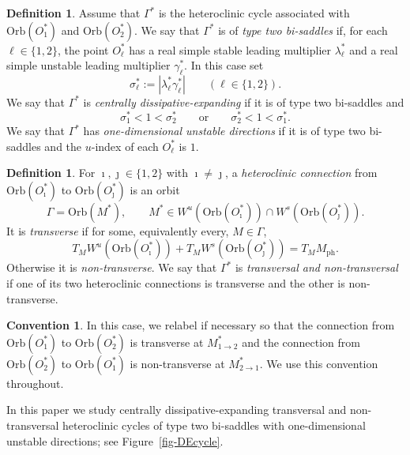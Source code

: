 \documentclass[11pt,a4paper]{article}
\theoremstyle{plain}
\theoremstyle{definition}
\newtheorem{definition}[theorem]{Definition}
\newtheorem{convention}[theorem]{Convention}
\theoremstyle{plain}
\numberwithin{equation}{section}
\begin{document}
\begin{definition}
Assume that $\Gamma^*$ is the heteroclinic cycle associated with $\mathrm{Orb}(O_1^*)$ and $\mathrm{Orb}(O_2^*)$.
We say that $\Gamma^*$ is of \emph{type two bi-saddles} if, for each $\ell \in \{1,2\}$, the point $O_\ell^*$ has a real simple stable leading multiplier $\lambda_\ell^*$ and a real simple unstable leading multiplier $\gamma_\ell^*$. In this case set
\[
\sigma_\ell^* := |\lambda_\ell^* \gamma_\ell^*|
\qquad
(\ell \in \{1,2\}).
\]
We say that $\Gamma^*$ is \emph{centrally dissipative-expanding} if it is of type two bi-saddles and
\[
\sigma_1^* < 1 < \sigma_2^*
\qquad
\text{or}
\qquad
\sigma_2^* < 1 < \sigma_1^*.
\]
We say that $\Gamma^*$ has \emph{one-dimensional unstable directions} if it is of type two bi-saddles and the $u$-index of each $O_\ell^*$ is $1$.
\end{definition}

\begin{definition}
For $\imath,\jmath \in \{1,2\}$ with $\imath \neq \jmath$, a \emph{heteroclinic connection} from $\mathrm{Orb}(O_\imath^*)$ to $\mathrm{Orb}(O_\jmath^*)$ is an orbit
\[
\Gamma = \mathrm{Orb}(M^*), \qquad M^* \in W^u(\mathrm{Orb}(O_\imath^*)) \cap W^s(\mathrm{Orb}(O_\jmath^*)).
\]
It is \emph{transverse} if for some, equivalently every, $M \in \Gamma$,
\[
T_M W^u(\mathrm{Orb}(O_\imath^*)) + T_M W^s(\mathrm{Orb}(O_\jmath^*)) = T_M M_\mathrm{ph}.
\]
Otherwise it is \emph{non-transverse}. We say that $\Gamma^*$ is \emph{transversal and non-transversal} if one of its two heteroclinic connections is transverse and the other is non-transverse.
\end{definition}

\begin{convention}
In this case, we relabel if necessary so that the connection from $\mathrm{Orb}(O_1^*)$ to $\mathrm{Orb}(O_2^*)$ is transverse at $M_{1 \to 2}^*$ and the connection from $\mathrm{Orb}(O_2^*)$ to $\mathrm{Orb}(O_1^*)$ is non-transverse at $M_{2 \to 1}^*$. We use this convention throughout.
\end{convention}

In this paper we study centrally dissipative-expanding transversal and non-transversal heteroclinic cycles of type two bi-saddles with one-dimensional unstable directions; see Figure~\ref{fig-DEcycle}.
\end{document}
